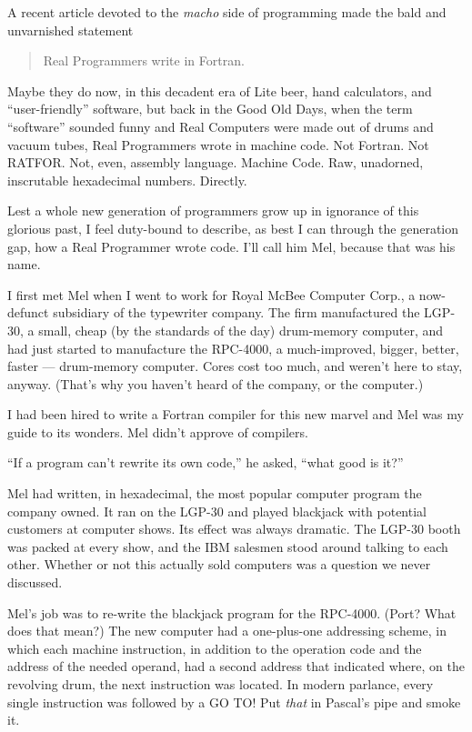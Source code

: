 \documentclass[12pt]{article}
\begin{document}
\noindent
A recent article devoted to the {\it macho} side of programming
made the bald and unvarnished statement

\begin{quote}
Real Programmers write in Fortran.
\end{quote}

\noindent
Maybe they do now, in this decadent era of Lite beer, hand
calculators, and ``user-friendly'' software, but back in the
Good Old Days, when the term ``software'' sounded funny and
Real Computers were made out of drums and vacuum tubes, Real
Programmers wrote in machine code. Not Fortran. Not RATFOR.
Not, even, assembly language. Machine Code. Raw,
unadorned, inscrutable hexadecimal numbers. Directly.

\bigskip
\noindent
Lest a whole new generation of programmers grow up in
ignorance of this glorious past, I feel duty-bound to
describe, as best I can through the generation gap, how a
Real Programmer wrote code. I'll call him Mel, because that
was his name.

\bigskip
\noindent
I first met Mel when I went to work for Royal McBee Computer
Corp., a now-defunct subsidiary of the typewriter company.
The firm manufactured the LGP-30, a small, cheap (by the
standards of the day) drum-memory computer, and had just
started to manufacture the RPC-4000, a much-improved,
bigger, better, faster --- drum-memory computer. Cores cost
too much, and weren't here to stay, anyway. (That's why you
haven't heard of the company, or the computer.)

\bigskip
\noindent
I had been hired to write a Fortran compiler
for this new marvel and Mel was my guide to its wonders.
Mel didn't approve of compilers.

\bigskip
\noindent
``If a program can't rewrite its own code,''
he asked, ``what good is it?''

\bigskip
\noindent
Mel had written,
in hexadecimal,
the most popular computer program the company owned.
It ran on the LGP-30
and played blackjack with potential customers
at computer shows.
Its effect was always dramatic.
The LGP-30 booth was packed at every show,
and the IBM salesmen stood around
talking to each other.
Whether or not this actually sold computers
was a question we never discussed.

\bigskip
\noindent
Mel's job was to re-write
the blackjack program for the RPC-4000.
(Port?  What does that mean?)
The new computer had a one-plus-one
addressing scheme,
in which each machine instruction,
in addition to the operation code
and the address of the needed operand,
had a second address that indicated where, on the revolving drum,
the next instruction was located.
In modern parlance,
every single instruction was followed by a GO TO!
Put {\it that} in Pascal's pipe and smoke it.
\end{document}
